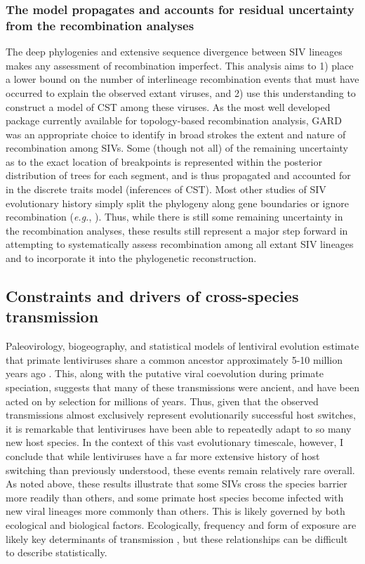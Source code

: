 \subsubsection*{The model propagates and accounts for residual uncertainty from the recombination analyses}
The deep phylogenies and extensive sequence divergence between SIV lineages makes any assessment of recombination imperfect.
This analysis aims to 1) place a lower bound on the number of interlineage recombination events that must have occurred to explain the observed extant viruses, and 2) use this understanding to construct a model of CST among these viruses.
As the most well developed package currently available for topology-based recombination analysis, GARD was an appropriate choice to identify in broad strokes the extent and nature of recombination among SIVs.
Some (though not all) of the remaining uncertainty as to the exact location of breakpoints is represented within the posterior distribution of trees for each segment, and is thus propagated and accounted for in the discrete traits model (inferences of CST).
Most other studies of SIV evolutionary history simply split the phylogeny along gene boundaries or ignore recombination (\textit{e.g.}, \citep{bailes2003hybrid,charleston2002preferential,sharp2011origins}).
Thus, while there is still some remaining uncertainty in the recombination analyses, these results still represent a major step forward in attempting to systematically assess recombination among all extant SIV lineages and to incorporate it into the phylogenetic reconstruction.

\subsection{Constraints and drivers of cross-species transmission}
Paleovirology, biogeography, and statistical models of lentiviral evolution estimate that primate lentiviruses share a common ancestor approximately 5-10 million years ago \citep{aiewsakun2016time,compton2013convergence,mccarthy2015evolutionary,worobey2010island}.
This, along with the putative viral coevolution during primate speciation, suggests that many of these transmissions were ancient, and have been acted on by selection for millions of years.
Thus, given that the observed transmissions almost exclusively represent evolutionarily successful host switches, it is remarkable that lentiviruses have been able to repeatedly adapt to so many new host species.
In the context of this vast evolutionary timescale, however, I conclude that while lentiviruses have a far more extensive history of host switching than previously understood, these events remain relatively rare overall.
As noted above, these results illustrate that some SIVs cross the species barrier more readily than others, and some primate host species become infected with new viral lineages more commonly than others.
This is likely governed by both ecological and biological factors.
Ecologically, frequency and form of exposure are likely key determinants of transmission \citep{locatelli2012cross}, but these relationships can be difficult to describe statistically.

